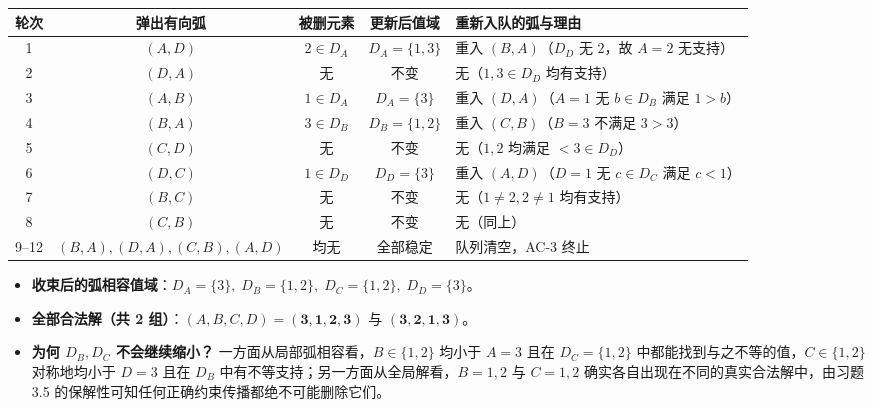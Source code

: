 \begin{center}
\footnotesize
\begin{tabularx}{\linewidth}{@{}c c c c X@{}}
\toprule
\textbf{轮次} & \textbf{弹出有向弧} & \textbf{被删元素} & \textbf{更新后值域} & \textbf{重新入队的弧与理由} \\
\midrule
1 & $(A, D)$ & $2 \in D_A$ & $D_A=\{1,3\}$ & 重入 $(B,A)$（$D_D$ 无 $2$，故 $A=2$ 无支持） \\
2 & $(D, A)$ & 无 & 不变 & 无（$1,3 \in D_D$ 均有支持） \\
3 & $(A, B)$ & $1 \in D_A$ & $D_A=\{3\}$ & 重入 $(D,A)$（$A=1$ 无 $b\in D_B$ 满足 $1>b$） \\
4 & $(B, A)$ & $3 \in D_B$ & $D_B=\{1,2\}$ & 重入 $(C,B)$（$B=3$ 不满足 $3>3$） \\
5 & $(C, D)$ & 无 & 不变 & 无（$1,2$ 均满足 $<3\in D_D$） \\
6 & $(D, C)$ & $1 \in D_D$ & $D_D=\{3\}$ & 重入 $(A,D)$（$D=1$ 无 $c\in D_C$ 满足 $c<1$） \\
7 & $(B, C)$ & 无 & 不变 & 无（$1\neq 2, 2\neq 1$ 均有支持） \\
8 & $(C, B)$ & 无 & 不变 & 无（同上） \\
9--12 & $(B,A),(D,A),(C,B),(A,D)$ & 均无 & 全部稳定 & 队列清空，AC-3 终止 \\
\bottomrule
\end{tabularx}
\end{center}
\begin{itemize}
  \item \textbf{收束后的弧相容值域}：$D_A = \{3\},\; D_B = \{1,2\},\; D_C = \{1,2\},\; D_D = \{3\}$。
  \item \textbf{全部合法解（共 2 组）}：$(A,B,C,D) = \mathbf{(3, 1, 2, 3)}$ 与 $\mathbf{(3, 2, 1, 3)}$。
  \item \textbf{为何 $D_B, D_C$ 不会继续缩小？} 一方面从局部弧相容看，$B\in\{1,2\}$ 均小于 $A=3$ 且在 $D_C=\{1,2\}$ 中都能找到与之不等的值，$C\in\{1,2\}$ 对称地均小于 $D=3$ 且在 $D_B$ 中有不等支持；另一方面从全局解看，$B=1,2$ 与 $C=1,2$ 确实各自出现在不同的真实合法解中，由习题 3.5 的保解性可知任何正确约束传播都绝不可能删除它们。
\end{itemize}

